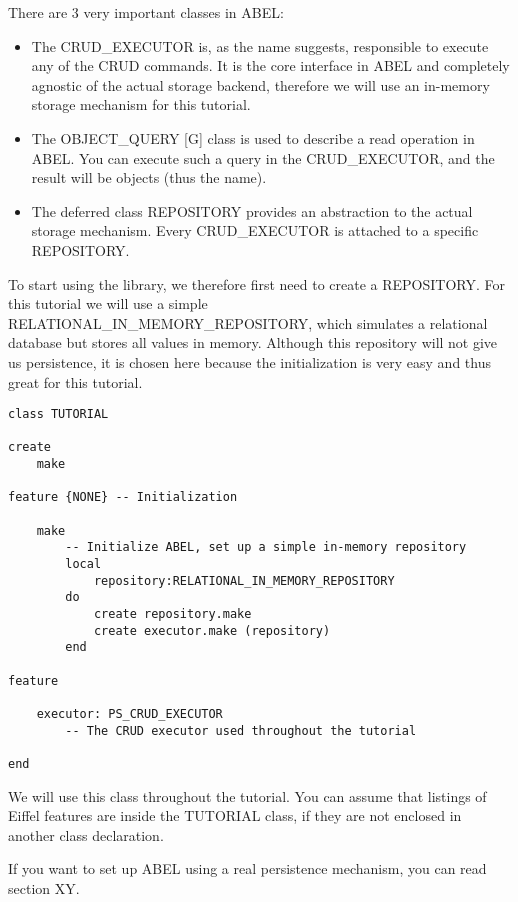 There are 3 very important classes in ABEL:
\begin{itemize}
 \item The CRUD\_EXECUTOR is, as the name suggests, responsible to execute any of the CRUD commands.
	It is the core interface in ABEL and completely agnostic of the actual storage backend, therefore we will use an in-memory storage mechanism for this tutorial.

 \item The OBJECT\_QUERY [G] class is used to describe a read operation in ABEL. You can execute such a query in the CRUD\_EXECUTOR, and the result will be objects (thus the name).

 \item The deferred class REPOSITORY provides an abstraction to the actual storage mechanism.
	Every CRUD\_EXECUTOR is attached to a specific REPOSITORY.
\end{itemize}


To start using the library, we therefore first need to create a REPOSITORY.
For this tutorial we will use a simple RELATIONAL\_IN\_MEMORY\_REPOSITORY, which simulates a relational database but stores all values in memory.
Although this repository will not give us persistence, it is chosen here because the initialization is very easy and thus great for this tutorial.


\begin{lstlisting}[language=OOSC2Eiffel, captionpos=b, caption={The TUTORIAL class}, label={lst:tutorial_class}]
class TUTORIAL

create
	make

feature {NONE} -- Initialization

	make
		-- Initialize ABEL, set up a simple in-memory repository
		local
			repository:RELATIONAL_IN_MEMORY_REPOSITORY
		do
			create repository.make
			create executor.make (repository)
		end

feature
	
	executor: PS_CRUD_EXECUTOR
		-- The CRUD executor used throughout the tutorial

end
\end{lstlisting}

We will use this class throughout the tutorial. You can assume that listings of Eiffel features are inside the TUTORIAL class, if they are not enclosed in another class declaration.

If you want to set up ABEL using a real persistence mechanism, you can read section XY.


